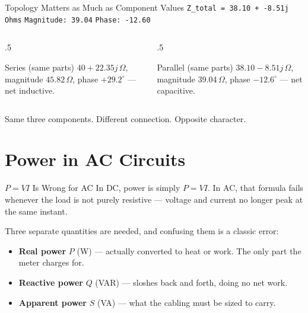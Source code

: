 \documentclass[9pt,aspectratio=169,xcolor=table]{beamer}
\begin{document}
\begin{frame}{Topology Matters as Much as Component Values}
    \leavevmode
    \texttt{Z\_total = 38.10 + -8.51j Ohms} \quad
    \texttt{Magnitude: 39.04} \quad
    \texttt{Phase: -12.60\textdegree}

    \vspace{4mm}
    \begin{columns}[t]
        \begin{column}{.5\textwidth}
            \begin{block}{Series (same parts)}
                \small $40 + 22.35j\,\Omega$, magnitude $45.82\,\Omega$,
                phase $+29.2^\circ$ --- net \alert{inductive}.
            \end{block}
        \end{column}
        \begin{column}{.5\textwidth}
            \begin{alertblock}{Parallel (same parts)}
                \small $38.10 - 8.51j\,\Omega$, magnitude
                $39.04\,\Omega$, phase $-12.6^\circ$ --- net
                \alert{capacitive}.
            \end{alertblock}
        \end{column}
    \end{columns}

    \vspace{3mm}
    {\small Same three components. Different connection. Opposite
    character.}
\end{frame}

\section{Power in AC Circuits}

\begin{frame}{$P = VI$ Is Wrong for AC}
    \leavevmode
    In DC, power is simply $P = VI$. In AC, that formula fails whenever
    the load is not purely resistive --- voltage and current no longer
    peak at the same instant.

    \vspace{3mm}
    Three separate quantities are needed, and confusing them is a
    classic error:
    \begin{itemize}
        \item \textbf{Real power} $P$ (W) --- actually converted to
              heat or work. The only part the meter charges for.
        \item \textbf{Reactive power} $Q$ (VAR) --- sloshes back and
              forth, doing no net work.
        \item \textbf{Apparent power} $S$ (VA) --- what the cabling
              must be sized to carry.
    \end{itemize}
\end{frame}
\end{document}
